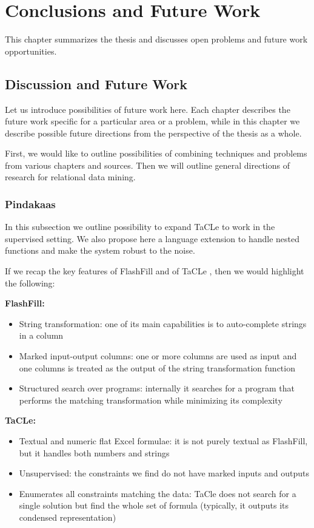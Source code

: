 \chapter{Conclusions and Future Work}\label{ch:conclusions}
\begin{addmargin}[2em]{2em}
This chapter summarizes the thesis and discusses open problems and
future work opportunities.
\end{addmargin}

\section{Discussion and Future Work}
Let us introduce possibilities of future work here. Each chapter
describes the future work specific for a particular area or a problem,
while in this chapter we describe possible future directions from the
perspective of the thesis as a whole.

First, we would like to outline possibilities of combining techniques
and problems from various chapters and sources. Then we will outline general 
directions of research for relational data mining.

\subsection{Pindakaas}
In this subsection we outline possibility to expand TaCLe to work in
the supervised setting. We also propose here a language extension to
handle nested functions and make the system robust to the noise.

If we recap the key features of FlashFill \parencite{flashfill} and of TaCLe
\parencite{tacle}, then we would highlight the following:

\textbf{FlashFill:}
\begin{itemize}
\item String transformation: one of its main capabilities is to
  auto-complete strings in a column 
\item Marked input-output columns: one or more columns are used as
  input and one columns is treated as the output of the string
  transformation function
\item Structured search over programs: internally it searches for a
  program that performs the matching transformation while minimizing
  its complexity
\end{itemize}

\textbf{TaCLe:}
\begin{itemize}
  \item Textual and numeric flat Excel formulae: it is not purely
    textual as FlashFill, but it handles both numbers and strings
  \item Unsupervised: the constraints we find do not have marked
    inputs and outputs
  \item Enumerates all constraints matching the data: TaCle does not
    search for a single solution but find the whole set of formula
    (typically, it outputs its condensed representation)
\end{itemize}

